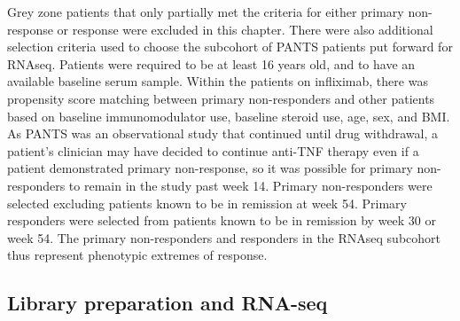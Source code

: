 %
Grey zone patients that only partially met the criteria for either primary non-response or response were excluded in this chapter.
There were also additional selection criteria used to choose the subcohort of \gls{PANTS} patients put forward for \gls{RNAseq}.
Patients were required to be at least 16 years old, and to have an available baseline serum sample.
Within the patients on infliximab, there was propensity score matching between primary non-responders and other patients based on baseline immunomodulator use, baseline steroid use, age, sex, and \gls{BMI}.
As \gls{PANTS} was an observational study that continued until drug withdrawal, a patient's clinician may have decided to continue anti-\gls{TNF} therapy even if a patient demonstrated primary non-response, so it was possible for primary non-responders to remain in the study past week 14.
Primary non-responders were selected excluding patients known to be in remission at week 54.
Primary responders were selected from patients known to be in remission by week 30 or week 54.
The primary non-responders and responders in the \gls{RNAseq} subcohort thus represent phenotypic extremes of response.

\subsection{Library preparation and RNA-seq}

